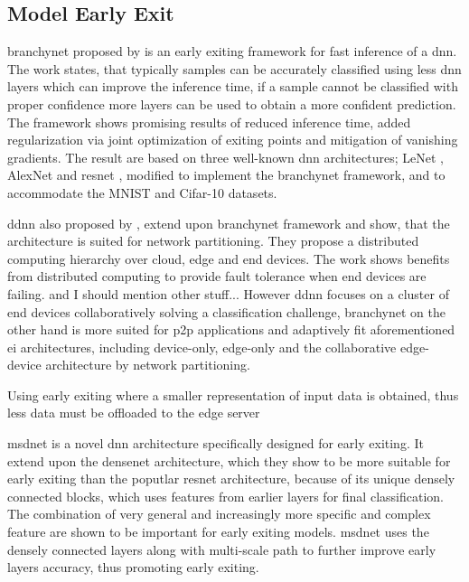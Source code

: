 \subsection{Model Early Exit}

\gls{branchynet} \cite{teerapittayanon_branchynet:_2016} proposed by \citeauthor{teerapittayanon_branchynet:_2016} is an early exiting framework for fast inference of a \gls{dnn}. The work states, that typically samples can be accurately classified using less \gls{dnn} layers which can improve the inference time, if a sample cannot be classified with proper confidence more layers can be used to obtain a more confident prediction. The framework shows promising results of reduced inference time, added regularization via joint optimization of exiting points and mitigation of vanishing gradients. The result are based on three well-known \gls{dnn} architectures; LeNet \cite{lecun_lecun-98.pdf_1998}, AlexNet \cite{krizhevsky_imagenet_2017} and \gls{resnet} \cite{he_deep_2015}, modified to implement the \gls{branchynet} framework, and to accommodate the MNIST \cite{lecun_mnist_2010} and Cifar-10 \cite{krizhevsky_cifar-10_nodate} datasets.  

\gls{ddnn} \cite{teerapittayanon_distributed_2017} also proposed by \citeauthor{teerapittayanon_distributed_2017}, extend upon \gls{branchynet} framework and show, that the architecture is suited for network partitioning. They propose a distributed computing hierarchy over cloud, edge and end devices. The work shows benefits from distributed computing to provide fault tolerance when end devices are failing. and I should mention other stuff... However \gls{ddnn} focuses on a cluster of end devices collaboratively solving a classification challenge, \gls{branchynet} on the other hand is more suited for \gls{p2p} applications and adaptively fit aforementioned \gls{ei} architectures, including device-only, edge-only and the collaborative edge-device architecture by network partitioning.


Using early exiting where a smaller representation of input data is obtained, thus less data must be offloaded to the edge server

\gls{msdnet} \cite{huang_multi-scale_2017} is a novel \gls{dnn} architecture specifically designed for early exiting. It extend upon the \gls{densenet} \cite{huang_densely_2016} architecture, which they show to be more suitable for early exiting than the poputlar \gls{resnet} architecture, because of its unique densely connected blocks, which uses features from earlier layers for final classification. The combination of very general and increasingly more specific and complex feature are shown to be important for early exiting models. \gls{msdnet} uses the densely connected layers along with multi-scale path to further improve early layers accuracy, thus promoting early exiting.